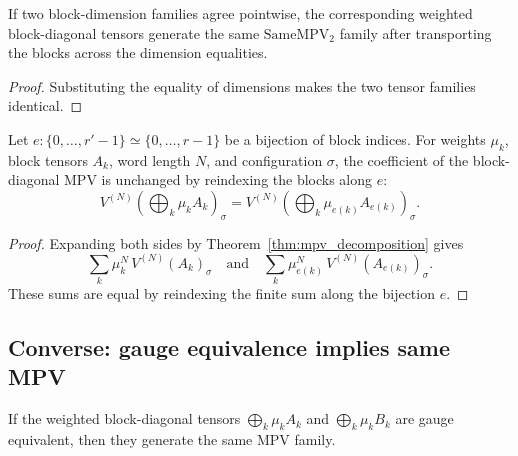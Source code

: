 \begin{lemma}\label{lem:mpv_cast_blocks}
    \leanok
    If two block-dimension families agree pointwise, the corresponding
    weighted block-diagonal tensors generate the same $\mathrm{SameMPV}_2$
    family after transporting the blocks across the dimension equalities.
\end{lemma}

\begin{proof}\leanok
    Substituting the equality of dimensions makes the two tensor families
    identical.
\end{proof}

\begin{lemma}\label{lem:mpv_reindex_blocks}
    \leanok
    Let $e : \{0,\ldots,r'-1\}\simeq\{0,\ldots,r-1\}$ be a bijection of block
    indices. For weights $\mu_k$, block tensors $A_k$, word length $N$, and
    configuration $\sigma$, the coefficient of the block-diagonal MPV is unchanged
    by reindexing the blocks along $e$:
    \[
        V^{(N)}\!\left(\bigoplus_k \mu_k A_k\right)_\sigma
        =
        V^{(N)}\!\left(\bigoplus_k \mu_{e(k)} A_{e(k)}\right)_\sigma .
    \]
\end{lemma}

\begin{proof}\leanok
    Expanding both sides by Theorem~\ref{thm:mpv_decomposition} gives
    \[
        \sum_k \mu_k^N\,V^{(N)}(A_k)_\sigma
        \quad\text{and}\quad
        \sum_k \mu_{e(k)}^N\,V^{(N)}(A_{e(k)})_\sigma .
    \]
    These sums are equal by reindexing the finite sum along the bijection $e$.
\end{proof}

\subsection{Converse: gauge equivalence implies same MPV}%
\label{subsec:converse_gauge_mpv}

\begin{lemma}\label{lem:gauge_equiv_implies_same_mpv}
    \leanok
    If the weighted block-diagonal tensors $\bigoplus_k \mu_k A_k$ and
    $\bigoplus_k \mu_k B_k$ are gauge equivalent, then they generate the
    same MPV family.
\end{lemma}

